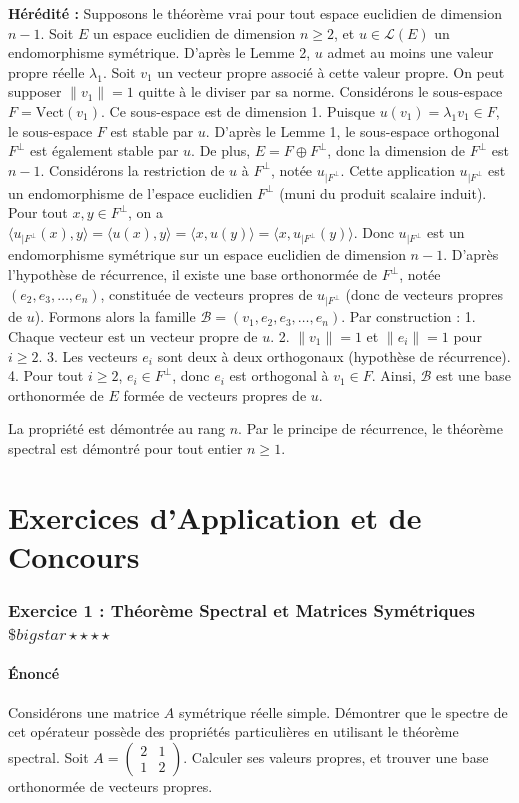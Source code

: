 \documentclass[11pt,a4paper]{article}
\begin{document}
\textbf{Hérédité :}
Supposons le théorème vrai pour tout espace euclidien de dimension $n-1$.
Soit $E$ un espace euclidien de dimension $n \ge 2$, et $u \in \mathcal{L}(E)$ un endomorphisme symétrique.
D'après le Lemme 2, $u$ admet au moins une valeur propre réelle $\lambda_1$.
Soit $v_1$ un vecteur propre associé à cette valeur propre. On peut supposer $\|v_1\| = 1$ quitte à le diviser par sa norme.
Considérons le sous-espace $F = \text{Vect}(v_1)$. Ce sous-espace est de dimension 1.
Puisque $u(v_1) = \lambda_1 v_1 \in F$, le sous-espace $F$ est stable par $u$.
D'après le Lemme 1, le sous-espace orthogonal $F^\perp$ est également stable par $u$.
De plus, $E = F \oplus F^\perp$, donc la dimension de $F^\perp$ est $n - 1$.
Considérons la restriction de $u$ à $F^\perp$, notée $u_{|F^\perp}$.
Cette application $u_{|F^\perp}$ est un endomorphisme de l'espace euclidien $F^\perp$ (muni du produit scalaire induit).
Pour tout $x, y \in F^\perp$, on a $\langle u_{|F^\perp}(x), y \rangle = \langle u(x), y \rangle = \langle x, u(y) \rangle = \langle x, u_{|F^\perp}(y) \rangle$.
Donc $u_{|F^\perp}$ est un endomorphisme symétrique sur un espace euclidien de dimension $n-1$.
D'après l'hypothèse de récurrence, il existe une base orthonormée de $F^\perp$, notée $(e_2, e_3, \dots, e_n)$, constituée de vecteurs propres de $u_{|F^\perp}$ (donc de vecteurs propres de $u$).
Formons alors la famille $\mathcal{B} = (v_1, e_2, e_3, \dots, e_n)$.
Par construction :
1. Chaque vecteur est un vecteur propre de $u$.
2. $\|v_1\| = 1$ et $\|e_i\| = 1$ pour $i \ge 2$.
3. Les vecteurs $e_i$ sont deux à deux orthogonaux (hypothèse de récurrence).
4. Pour tout $i \ge 2$, $e_i \in F^\perp$, donc $e_i$ est orthogonal à $v_1 \in F$.
Ainsi, $\mathcal{B}$ est une base orthonormée de $E$ formée de vecteurs propres de $u$.

La propriété est démontrée au rang $n$.
Par le principe de récurrence, le théorème spectral est démontré pour tout entier $n \ge 1$.


\part{Exercices d'Application et de Concours}
\section{Exercice 1 : Théorème Spectral et Matrices Symétriques \quad $\$bigstar\star\star\star\star$}

\subsection{Énoncé}
Considérons une matrice $A$ symétrique réelle simple.
Démontrer que le spectre de cet opérateur possède des propriétés particulières en utilisant le théorème spectral.
Soit $A = \begin{pmatrix} 2 & 1 \\ 1 & 2 \end{pmatrix}$.
Calculer ses valeurs propres, et trouver une base orthonormée de vecteurs propres.
\end{document}
